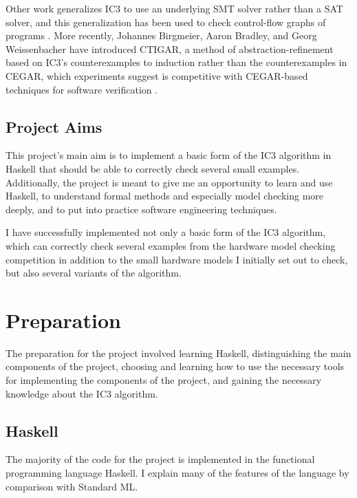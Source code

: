 \documentclass[12pt,a4paper,twoside,openright]{report}
\begin{document}
Other work generalizes IC3 to use an underlying SMT solver rather than a
SAT solver, and this generalization has been used to check control-flow
graphs of programs \cite{cimatti12}.
More recently, Johannes Birgmeier, Aaron Bradley, and Georg Weissenbacher
have introduced CTIGAR, a method of abstraction-refinement based on IC3's
counterexamples to induction rather than the counterexamples in CEGAR,
which experiments suggest is competitive with CEGAR-based techniques for
software verification \cite{birgmeier14}.

\section{Project Aims}

This project's main aim is to implement a basic form of the IC3 algorithm in
Haskell that should be able to correctly check several
small examples. Additionally, the project is meant to give me an opportunity
to learn and use Haskell, to understand formal methods and especially model
checking more deeply, and to put into practice software engineering techniques.

I have successfully implemented not only a basic form of the IC3 algorithm,
which can correctly check several examples from the hardware model checking
competition in addition to the small hardware models I initially set out
to check, but also several variants of the algorithm.

\chapter{Preparation}

The preparation for the project involved learning Haskell, distinguishing
the main components of the project, choosing and learning how to use
the necessary tools for implementing the components of the project,
and gaining the necessary knowledge about the IC3 algorithm.

\section{Haskell}

The majority of the code for the project is implemented in the functional
programming language Haskell. I explain many of the features of the
language by comparison with Standard ML.

\end{document}
